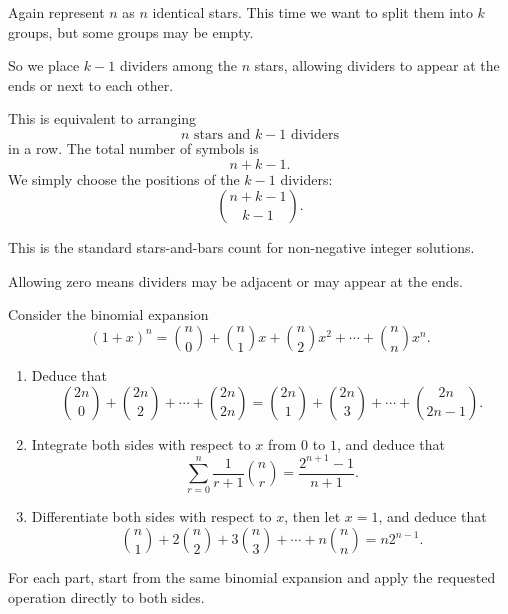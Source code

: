 \begin{solution}
Again represent $n$ as $n$ identical stars. This time we want to split them into $k$ groups, but some groups may be empty.

So we place $k-1$ dividers among the $n$ stars, allowing dividers to appear at the ends or next to each other.

This is equivalent to arranging
\[
n \text{ stars and } k-1 \text{ dividers}
\]
in a row. The total number of symbols is
\[
n+k-1.
\]
We simply choose the positions of the $k-1$ dividers:
\[
\boxed{\binom{n+k-1}{k-1}}.
\]
\end{solution}

\begin{takeaways}
\item This is the standard stars-and-bars count for non-negative integer solutions.
\item Allowing zero means dividers may be adjacent or may appear at the ends.
\end{takeaways}

\begin{problem}
Consider the binomial expansion
\[
(1+x)^n=\binom{n}{0}+\binom{n}{1}x+\binom{n}{2}x^2+\cdots+\binom{n}{n}x^n.
\]

\begin{enumerate}[label=\roman*)]
\item Deduce that
\[
\binom{2n}{0}+\binom{2n}{2}+\cdots+\binom{2n}{2n}
=
\binom{2n}{1}+\binom{2n}{3}+\cdots+\binom{2n}{2n-1}.
\]

\item Integrate both sides with respect to $x$ from $0$ to $1$, and deduce that
\[
\sum_{r=0}^n \frac{1}{r+1}\binom{n}{r}=\frac{2^{n+1}-1}{n+1}.
\]

\item Differentiate both sides with respect to $x$, then let $x=1$, and deduce that
\[
\binom{n}{1}+2\binom{n}{2}+3\binom{n}{3}+\cdots+n\binom{n}{n}=n2^{n-1}.
\]
\end{enumerate}
\end{problem}

\begin{hint}
For each part, start from the same binomial expansion and apply the requested operation directly to both sides.
\end{hint}

